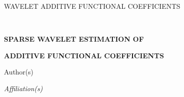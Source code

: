 
\renewcommand{\baselinestretch}{2}


{\hfill {\footnotesize\rm WAVELET ADDITIVE FUNCTIONAL COEFFICIENTS} \hfill}

\renewcommand{\thefootnote}{}
$\ $\par


\fontsize{12}{14pt plus.8pt minus .6pt}\selectfont \vspace{0.8pc}
\centerline{\large\bf SPARSE WAVELET ESTIMATION OF}
\vspace{2pt}
\centerline{\large\bf ADDITIVE FUNCTIONAL COEFFICIENTS}
\vspace{.4cm}
\centerline{Author(s)}
\vspace{.4cm}
\centerline{\it Affiliation(s)}
\vspace{.55cm} \fontsize{9}{11.5pt plus.8pt minus.6pt}\selectfont



